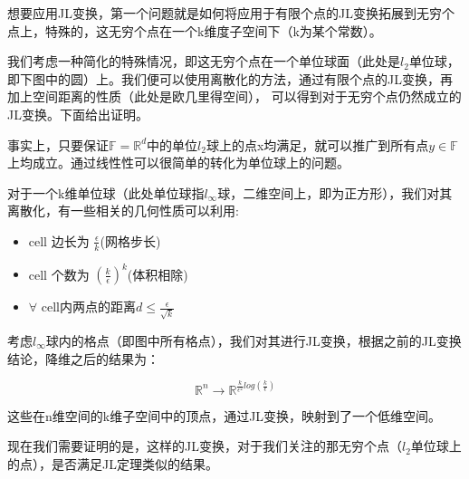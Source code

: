 \documentclass[lang=cn,newtx,10pt,scheme=chinese,chinesefont=nofont,citestyle=gb7714-2015, bibstyle=gb7714-2015]{elegantbook}
\begin{document}
\begin{refsection}
想要应用JL变换，第一个问题就是如何将应用于有限个点的JL变换拓展到无穷个点上，特殊的，这无穷个点在一个k维度子空间下（k为某个常数）。

我们考虑一种简化的特殊情况，即这无穷个点在一个单位球面（此处是$l_2$单位球，即下图中的圆）上。我们便可以使用离散化的方法，通过有限个点的JL变换，再加上空间距离的性质（此处是欧几里得空间），
可以得到对于无穷个点仍然成立的JL变换。下面给出证明。

\begin{remark}
    事实上，只要保证$\mathbb{F}=\mathbb{R}^d$中的单位$l_2$球上的点x均满足，就可以推广到所有点$y\in \mathbb{F}$上均成立。通过线性性可以很简单的转化为单位球上的问题。

对于一个k维单位球（此处单位球指$l_\infty$球，二维空间上，即为正方形），我们对其离散化，有一些相关的几何性质可以利用:
  
\begin{itemize}
    \item cell 边长为 $\frac{\epsilon}{{k}}$(网格步长)
    \item cell 个数为 $(\frac{k}{\epsilon})^k$(体积相除)
    \item $\forall$ cell内两点的距离$d \le \frac{\epsilon}{\sqrt{k}}$
\end{itemize}
\begin{center}
\end{center}

考虑$l_\infty$球内的格点（即图中所有格点），我们对其进行JL变换，根据之前的JL变换结论，降维之后的结果为：

$$
\mathbb{R}^n \longrightarrow \mathbb{R}^{\frac{k}{\epsilon^2}log(\frac{k}{\epsilon})}
$$


    这些在n维空间的k维子空间中的顶点，通过JL变换，映射到了一个低维空间。
\end{remark}

\noindent 现在我们需要证明的是，这样的JL变换，对于我们关注的那无穷个点（$l_2$单位球上的点），是否满足JL定理类似的结果。


\end{refsection}
\end{document}
